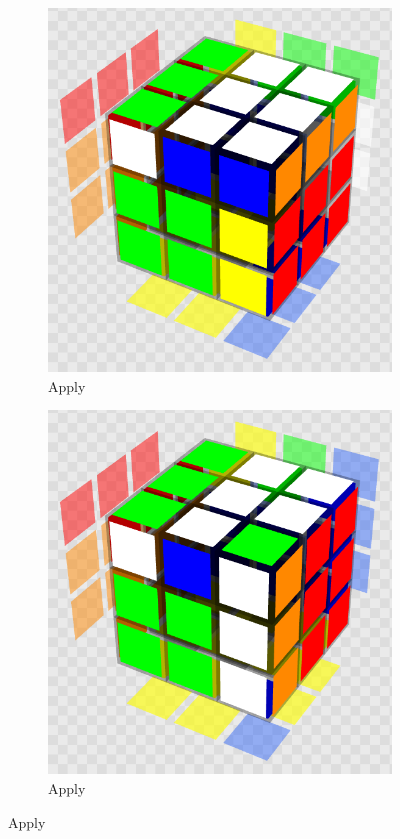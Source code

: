 \begin{figure}[h]
\begin{subfigure}{0.25\textwidth}
    \end{subfigure}%
    \begin{subfigure}{0.25\textwidth}
        \centering
        \caption{Apply }
        \label{fig:notation-demo-u2}
        \includegraphics[width=.90\linewidth]{Figures/2 Background/U2.png}
    \end{subfigure}%
    \begin{subfigure}{0.25\textwidth}
        \centering
        \caption{Apply }
        \label{fig:notation-demo-rprime}
        \includegraphics[width=.90\linewidth]{Figures/2 Background/R'.png}
    \end{subfigure}%
\end{figure}


